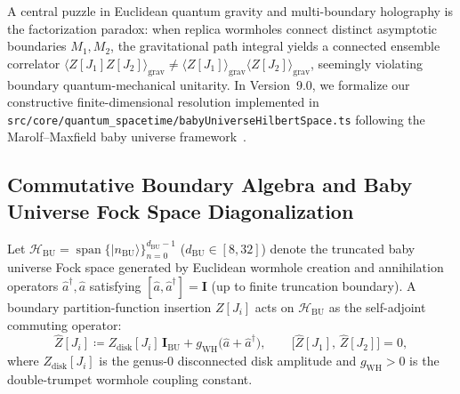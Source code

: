 \documentclass[11pt,a4paper,reqno]{article}
\theoremstyle{plain}
\theoremstyle{definition}
\theoremstyle{remark}
\numberwithin{equation}{section}
\begin{document}
A central puzzle in Euclidean quantum gravity and multi-boundary holography is the factorization paradox: when replica wormholes connect distinct asymptotic boundaries $M_1, M_2$, the gravitational path integral yields a connected ensemble correlator $\langle Z[J_1] Z[J_2] \rangle_{\mathrm{grav}} \neq \langle Z[J_1] \rangle_{\mathrm{grav}} \langle Z[J_2] \rangle_{\mathrm{grav}}$, seemingly violating boundary quantum-mechanical unitarity. In Version~9.0, we formalize our constructive finite-dimensional resolution implemented in \texttt{src/core/quantum\_spacetime/babyUniverseHilbertSpace.ts} following the Marolf--Maxfield baby universe framework~\cite{MarolfMaxfield2020,Coleman1988}.

\subsection{Commutative Boundary Algebra and Baby Universe Fock Space Diagonalization}
Let $\mathcal{H}_{\mathrm{BU}} = \operatorname{span}\{|n_{\mathrm{BU}}\rangle\}_{n=0}^{d_{\mathrm{BU}}-1}$ ($d_{\mathrm{BU}} \in [8, 32]$) denote the truncated baby universe Fock space generated by Euclidean wormhole creation and annihilation operators $\hat{a}^\dagger, \hat{a}$ satisfying $[\hat{a}, \hat{a}^\dagger] = \bm{I}$ (up to finite truncation boundary). A boundary partition-function insertion $Z[J_i]$ acts on $\mathcal{H}_{\mathrm{BU}}$ as the self-adjoint commuting operator:
\begin{equation}
\label{eq:boundary_partition_operator}
\hat{Z}[J_i] \coloneqq Z_{\mathrm{disk}}[J_i]\,\bm{I}_{\mathrm{BU}} + g_{\mathrm{WH}}\bigl(\hat{a} + \hat{a}^\dagger\bigr), \qquad
\bigl[\hat{Z}[J_1],\, \hat{Z}[J_2]\bigr] = 0,
\end{equation}
where $Z_{\mathrm{disk}}[J_i]$ is the genus-$0$ disconnected disk amplitude and $g_{\mathrm{WH}} > 0$ is the double-trumpet wormhole coupling constant.
\end{document}
